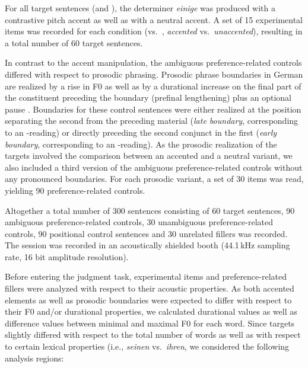 \documentclass[fleqn,reqno,10pt,draft]{article}
\newcommand{\as}{\acro{as}}
\renewcommand{\es}{\acro{es}}
\newcommand{\lc}{\acro{lc}}
\newcommand{\ec}{\acro{ec}}
\begin{document}
For all target sentences (\as and \es), the determiner \emph{einige} was
produced with a contrastive pitch accent as well as with a neutral
accent. %
A set of 15 
experimental items was recorded for each condition (\as vs.~\es, \emph{accented} 
vs.~\emph{unaccented}), resulting in a total number of 60 target sentences.

In contrast to the accent manipulation, the ambiguous
preference-related controls differed with respect to prosodic
phrasing. Prosodic phrase boundaries in German are realized by a rise
in F0 as well as by a durational increase on the final part of the
constituent preceding the boundary (prefinal lengthening) plus an
optional pause \citep[e.g.][]{Vaissiere83,Fery93}.  Boundaries for
these control sentences were either realized at the position
separating the second  from the preceding material
(\emph{late boundary}, corresponding to an \ec-reading) or directly
preceding the second conjunct in the first  (\emph{early
  boundary}, corresponding to an \lc-reading). As the prosodic
realization of the targets involved the comparison between an accented
and a neutral variant, we also included a third version of the
ambiguous preference-related controls without any pronounced
boundaries. For each prosodic variant, a set of 30 items was read,
yielding 90 preference-related controls.

Altogether a total number of 300 sentences consisting of 60 target
sentences, 90 ambiguous preference-related controls, 30 unambiguous
preference-related controls, 90 positional control sentences and 30
unrelated fillers was recorded. The session was recorded in an
acoustically shielded booth (44.1\,kHz sampling rate, 16 bit amplitude
resolution).

Before entering the judgment task, experimental items and
preference-related fillers were analyzed with respect to their acoustic
properties. As both accented elements as well as prosodic boundaries
were expected to differ with respect to their F0 and/or durational
properties, we calculated durational values as well as difference
values between minimal and maximal F0 for each word. Since targets
slightly differed with respect to the total number of words as well as
with respect to certain lexical properties (i.e., \emph{seinen}
vs.~\emph{ihren}, we considered the following analysis regions:
\end{document}
